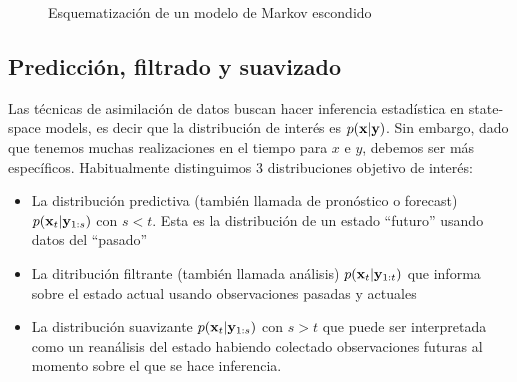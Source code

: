 \begin{figure}[h]
    \centering
    \caption{Esquematización de un modelo de Markov escondido} \label{dia:hmm}
\end{figure}

\subsection{Predicción, filtrado y suavizado}

Las técnicas de asimilación de datos buscan hacer inferencia estadística en state-space models, es decir que la distribución de interés es $p(\mathbf{x} | \mathbf{y})$. Sin embargo, dado que tenemos muchas realizaciones en el tiempo para $x$ e $y$, debemos ser más específicos. Habitualmente distinguimos 3 distribuciones objetivo de interés:
\begin{itemize}
    \item La distribución predictiva (también llamada de pronóstico o forecast) $p(\mathbf{x}_t | \mathbf{y}_{1:s})$ con $s < t$. Esta es la distribución de un estado ``futuro'' usando datos del ``pasado''
    \item La ditribución filtrante (también llamada análisis) $p(\mathbf{x}_t | \mathbf{y}_{1:t})$ que informa sobre el estado actual usando observaciones pasadas y actuales
    \item La distribución suavizante $p(\mathbf{x}_t | \mathbf{y}_{1:s})$ con $s > t$ que puede ser interpretada como un reanálisis del estado habiendo colectado observaciones futuras al momento sobre el que se hace inferencia.
\end{itemize}

